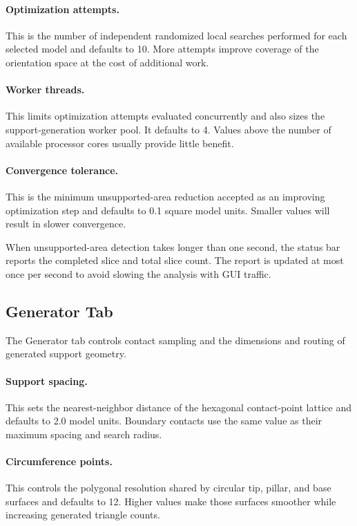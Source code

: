 \paragraph{Optimization attempts.}
This is the number of independent randomized local searches performed for each
selected model and defaults to 10. More attempts improve coverage of the
orientation space at the cost of additional work.

\paragraph{Worker threads.}
This limits optimization attempts evaluated concurrently and also sizes the
support-generation worker pool. It defaults to 4. Values above the number of
available processor cores usually provide little benefit.

\paragraph{Convergence tolerance.}
This is the minimum unsupported-area reduction accepted as an improving
optimization step and defaults to 0.1 square model units. Smaller values will
result in slower convergence.

When unsupported-area detection takes longer than one second, the status bar
reports the completed slice and total slice count. The report is updated at
most once per second to avoid slowing the analysis with GUI traffic.


\subsection{Generator Tab}
\label{settings-generator}

The Generator tab controls contact sampling and the dimensions and routing of
generated support geometry.

\paragraph{Support spacing.}
This sets the nearest-neighbor distance of the hexagonal contact-point lattice
and defaults to 2.0 model units. Boundary contacts use the same value as their
maximum spacing and search radius.

\paragraph{Circumference points.}
This controls the polygonal resolution shared by circular tip, pillar, and base
surfaces and defaults to 12. Higher values make those surfaces smoother while
increasing generated triangle counts.

